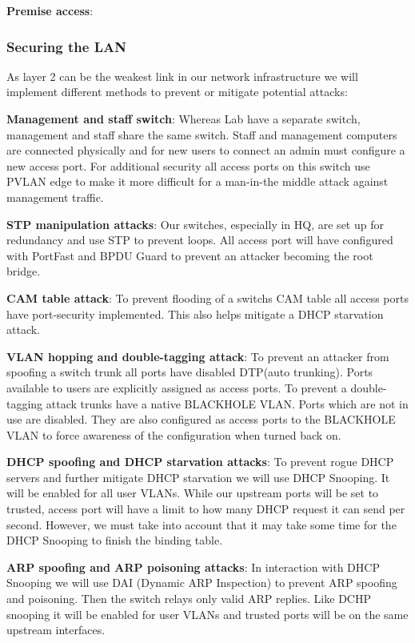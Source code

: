 \textbf{Premise access}:

\subsubsection{Securing the LAN}
As layer 2 can be the weakest link in our network infrastructure we will implement different methods to prevent or mitigate potential attacks:

\textbf{Management and staff switch}: Whereas Lab have a separate switch, management and staff share the same switch. Staff and management computers are connected physically and for new users to connect an admin must configure a new access port. For additional security all access ports on this switch use PVLAN edge to make it more difficult for a man-in-the middle attack against management traffic.

\textbf{STP manipulation attacks}: Our switches, especially in HQ, are set up for redundancy and use STP to prevent loops. All access port will have configured with PortFast and BPDU Guard to prevent an attacker becoming the root bridge.

\textbf{CAM table attack}: To prevent flooding of a switchs CAM table all access ports have port-security implemented. This also helps mitigate a DHCP starvation attack.

\textbf{VLAN hopping and double-tagging attack}: To prevent an attacker from spoofing a switch trunk all ports have disabled DTP(auto trunking). Ports available to users are explicitly assigned as access ports. To prevent a double-tagging attack trunks have a native BLACKHOLE VLAN. Ports which are not in use are disabled. They are also configured as access ports to the BLACKHOLE VLAN to force awareness of the configuration when turned back on.

\textbf{DHCP spoofing and DHCP starvation attacks}: To prevent rogue DHCP servers and further mitigate DHCP starvation we will use DHCP Snooping. It will be enabled for all user VLANs. While our upstream ports will be set to trusted, access port will have a limit to how many DHCP request it can send per second. However, we must take into account that it may take some time for the DHCP Snooping to finish the binding table. 

\textbf{ARP spoofing and ARP poisoning attacks}: In interaction with DHCP Snooping we will use DAI (Dynamic ARP Inspection) to prevent ARP spoofing and poisoning. Then the switch relays only valid ARP replies. Like DCHP snooping it will be enabled for user VLANs and trusted ports will be on the same upstream interfaces. 

